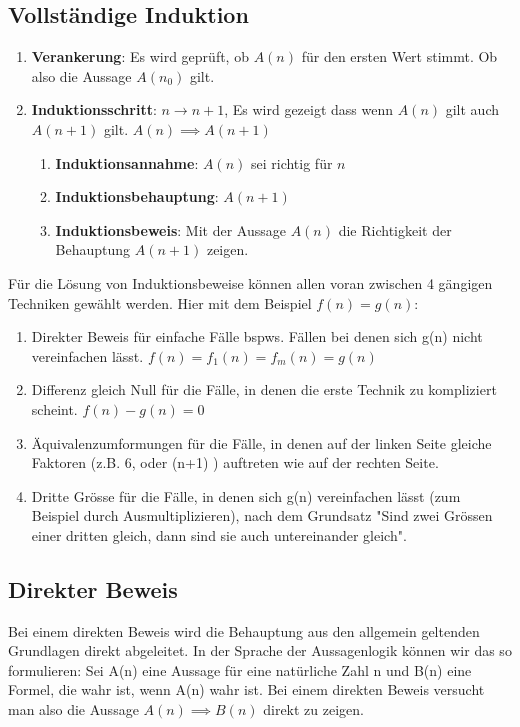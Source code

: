 \documentclass[../Main.tex]{subfiles}
\begin{document}
\subsection{Vollständige Induktion}
\begin{enumerate}
    \item \textbf{Verankerung}: Es wird geprüft, ob \(A(n)\) für den ersten Wert stimmt.
    Ob also die Aussage \( A(n_0) \) gilt.
    \item \textbf{Induktionsschritt}: \(n \rightarrow n+1 \), Es wird gezeigt dass wenn \(A(n)\) gilt auch \(A(n+1)\) gilt. \( A(n) \implies A(n+1)\)
    \begin{enumerate}
        \item \textbf{Induktionsannahme}: \(A(n)\) sei richtig für \(n\)
        \item \textbf{Induktionsbehauptung}: \(A(n+1)\)
        \item \textbf{Induktionsbeweis}: Mit der Aussage \(A(n)\) die Richtigkeit der Behauptung \(A(n+1)\) zeigen.
    \end{enumerate}
\end{enumerate}
Für die Lösung von Induktionsbeweise können allen voran zwischen 4 gängigen Techniken gewählt werden.
Hier mit dem Beispiel \(f(n)=g(n)\):
\begin{enumerate}
    \item Direkter Beweis für einfache Fälle bspws. Fällen bei denen sich g(n) nicht vereinfachen lässt.
    \(f(n)=f_1(n)=f_m(n)=g(n)\)
    \item Differenz gleich Null für die Fälle, in denen die erste Technik zu kompliziert 
    scheint. \(f(n)-g(n)=0\)
    \item Äquivalenzumformungen für die Fälle, in denen auf der linken Seite 
    gleiche Faktoren (z.B. 6, oder (n+1) ) auftreten wie auf der rechten Seite.
    \item Dritte Grösse für die Fälle, in denen sich g(n) vereinfachen lässt (zum 
    Beispiel durch Ausmultiplizieren), nach dem Grundsatz "Sind zwei Grössen einer 
    dritten gleich, dann sind sie auch untereinander gleich".
\end{enumerate}

\subsection{Direkter Beweis}
Bei einem direkten Beweis wird die Behauptung aus den allgemein geltenden Grundlagen 
direkt abgeleitet. In der Sprache der Aussagenlogik können wir das so formulieren: Sei 
A(n) eine Aussage für eine natürliche Zahl n und B(n) eine Formel, die wahr ist, wenn 
A(n) wahr ist. Bei einem direkten Beweis versucht man also die Aussage \( A(n) \implies B(n)\)
direkt zu zeigen. 
\end{document}
